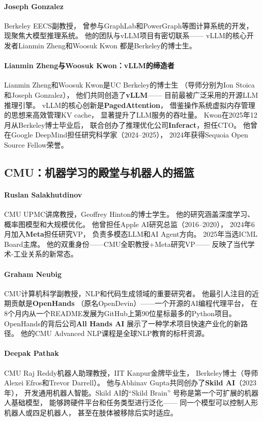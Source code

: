 \paragraph{Joseph Gonzalez}
Berkeley EECS副教授，
曾参与GraphLab和PowerGraph等图计算系统的开发，
现聚焦大模型推理系统。
他的团队与vLLM项目有密切联系——
vLLM的核心开发者Lianmin Zheng和Woosuk Kwon
都是Berkeley的博士生。

\paragraph{Lianmin Zheng与Woosuk Kwon：vLLM的缔造者}
Lianmin Zheng和Woosuk Kwon是UC Berkeley的博士生
（导师分别为Ion Stoica和Joseph Gonzalez），
他们共同创造了\textbf{vLLM}——
目前最被广泛采用的开源LLM推理引擎。
vLLM的核心创新是\textbf{PagedAttention}，
借鉴操作系统虚拟内存管理的思想来高效管理KV cache，
显著提升了LLM服务的吞吐量。
Kwon在2025年12月从Berkeley博士毕业后，
联合创办了推理优化公司\textbf{Inferact}，担任CTO。
他曾在Google DeepMind担任研究科学家（2024--2025），
2024年获得Sequoia Open Source Fellow荣誉。

\subsection{CMU：机器学习的殿堂与机器人的摇篮}

\paragraph{Ruslan Salakhutdinov}
CMU UPMC讲席教授，Geoffrey Hinton的博士学生。
他的研究涵盖深度学习、概率图模型和大规模优化。
他曾担任Apple AI研究总监（2016--2020），
2024年6月加入\textbf{Meta}担任研究VP，
负责多模态LLM和AI Agent方向。
2025年当选ICML Board主席。
他的双重身份——CMU全职教授+Meta研究VP——
反映了当代学术-工业关系的新常态。

\paragraph{Graham Neubig}
CMU计算机科学副教授，NLP和代码生成领域的重要研究者。
他最引人注目的近期贡献是\textbf{OpenHands}
（原名OpenDevin）——一个开源的AI编程代理平台，
在8个月内从一个README发展为GitHub上第90位星标最多的Python项目。
OpenHands的背后公司\textbf{All Hands AI}
展示了一种学术项目快速产业化的新路径。
他的CMU Advanced NLP课程是全球NLP教育的标杆资源。

\paragraph{Deepak Pathak}
CMU Raj Reddy机器人助理教授，IIT Kanpur金牌毕业生，
Berkeley博士（导师Alexei Efros和Trevor Darrell）。
他与Abhinav Gupta共同创办了\textbf{Skild AI}（2023年），
开发通用机器人智能。Skild AI的``Skild Brain''
号称是第一个可扩展的机器人基础模型，
能够跨硬件平台和任务类型进行泛化——
同一个模型可以控制人形机器人或四足机器人，
甚至在肢体被移除后实时适应。

